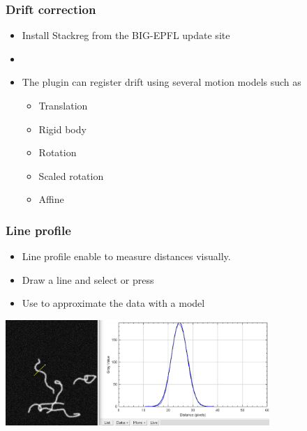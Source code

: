 \documentclass[ignorenonframetext,aspectratio=169,10pt,xcolor=table]{beamer}
\begin{document}
\begin{frame} \frametitle{Drift correction}
  \begin{itemize}
  \item Install Stackreg from the BIG-EPFL update site
  \item {}
  \item The plugin can register drift using several motion models such
    as
    \begin{itemize}
    \item Translation
    \item Rigid body
    \item Rotation
    \item Scaled rotation
    \item Affine
    \end{itemize}
  \end{itemize}
\end{frame}

\begin{frame} \frametitle{Line profile}
  \begin{itemize}
  \item Line profile enable to measure distances visually.
  \item Draw a line and select  or press
  \item Use  to approximate the data with a model
  \end{itemize}
  \begin{center}
    \includegraphics[width=0.75\textwidth]{line-profile}
  \end{center}
\end{frame}
\end{document}
